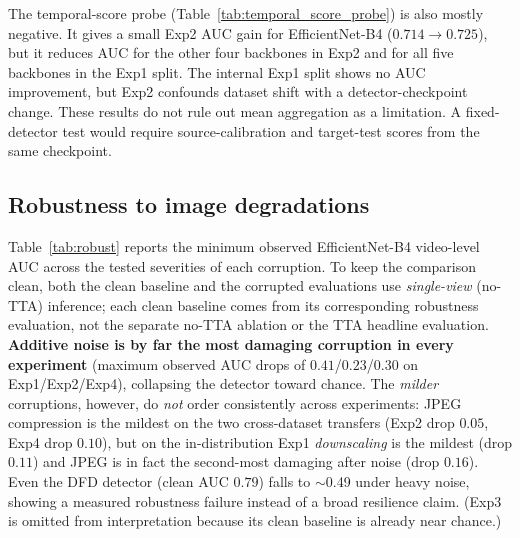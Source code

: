 The temporal-score probe (Table~\ref{tab:temporal_score_probe}) is also mostly negative. It gives a small Exp2 AUC gain for EfficientNet-B4 ($0.714\to0.725$), but it reduces AUC for the other four backbones in Exp2 and for all five backbones in the Exp1 split. The internal Exp1 split shows no AUC improvement, but Exp2 confounds dataset shift with a detector-checkpoint change. These results do not rule out mean aggregation as a limitation. A fixed-detector test would require source-calibration and target-test scores from the same checkpoint.

\subsection{Robustness to image degradations}
Table~\ref{tab:robust} reports the minimum observed EfficientNet-B4 video-level AUC across the tested severities of each corruption. To keep the comparison clean, both the clean baseline and the corrupted evaluations use \emph{single-view} (no-TTA) inference; each clean baseline comes from its corresponding robustness evaluation, not the separate no-TTA ablation or the TTA headline evaluation. \textbf{Additive noise is by far the most damaging corruption in every experiment} (maximum observed AUC drops of $0.41$/$0.23$/$0.30$ on Exp1/Exp2/Exp4), collapsing the detector toward chance. The \emph{milder} corruptions, however, do \emph{not} order consistently across experiments: JPEG compression is the mildest on the two cross-dataset transfers (Exp2 drop $0.05$, Exp4 drop $0.10$), but on the in-distribution Exp1 \emph{downscaling} is the mildest (drop $0.11$) and JPEG is in fact the second-most damaging after noise (drop $0.16$). Even the DFD detector (clean AUC $0.79$) falls to $\sim$0.49 under heavy noise, showing a measured robustness failure instead of a broad resilience claim. (Exp3 is omitted from interpretation because its clean baseline is already near chance.)
